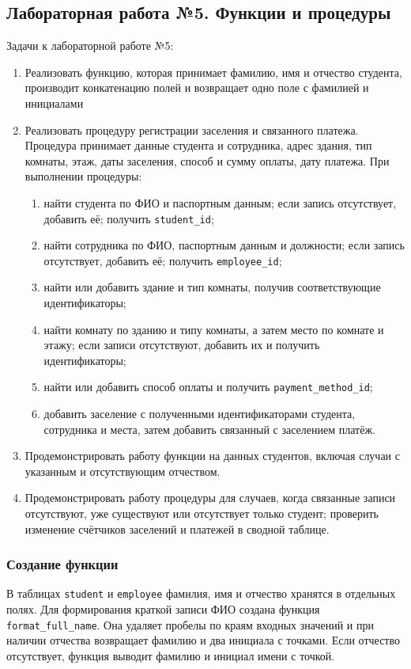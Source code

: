 \newpage
\subsection{Лабораторная работа №5. Функции и процедуры}
Задачи к лабораторной работе №5:
\begin{enumerate}
    \item Реализовать функцию, которая принимает фамилию, имя и отчество студента, производит конкатенацию полей и возвращает одно поле с фамилией и инициалами
    \item Реализовать процедуру регистрации заселения и связанного платежа. Процедура принимает данные студента и сотрудника, адрес здания, тип комнаты, этаж, даты заселения, способ и сумму оплаты, дату платежа. При выполнении процедуры:
    \begin{enumerate}[label=(\alph*)]
        \item найти студента по ФИО и паспортным данным; если запись отсутствует, добавить её; получить \texttt{student\_id};
        \item найти сотрудника по ФИО, паспортным данным и должности; если запись отсутствует, добавить её; получить \texttt{employee\_id};
        \item найти или добавить здание и тип комнаты, получив соответствующие идентификаторы;
        \item найти комнату по зданию и типу комнаты, а затем место по комнате и этажу; если записи отсутствуют, добавить их и получить идентификаторы;
        \item найти или добавить способ оплаты и получить \texttt{payment\_method\_id};
        \item добавить заселение с полученными идентификаторами студента, сотрудника и места, затем добавить связанный с заселением платёж.
    \end{enumerate}
    \item Продемонстрировать работу функции на данных студентов, включая случаи с указанным и отсутствующим отчеством.
    \item Продемонстрировать работу процедуры для случаев, когда связанные записи отсутствуют, уже существуют или отсутствует только студент; проверить изменение счётчиков заселений и платежей в сводной таблице.
\end{enumerate}

\subsubsection{Создание функции}
В таблицах \texttt{student} и \texttt{employee} фамилия, имя и отчество хранятся в отдельных полях. Для формирования краткой записи ФИО создана функция \texttt{format\_full\_name}. Она удаляет пробелы по краям входных значений и при наличии отчества возвращает фамилию и два инициала с точками. Если отчество отсутствует, функция выводит фамилию и инициал имени с точкой.


